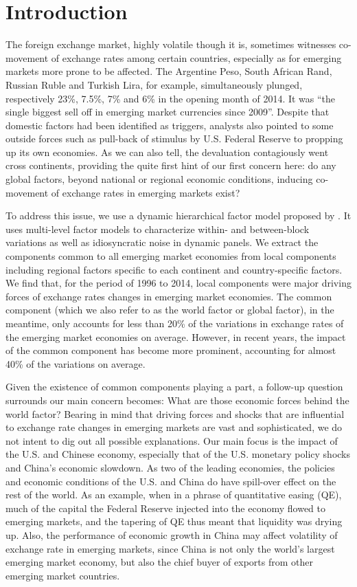 \documentclass[12pt]{article}
\numberwithin{equation}{section}
\begin{document}
\newpage
\section{Introduction}
The foreign exchange market, highly volatile though it is, sometimes witnesses co-movement of exchange rates among certain countries, especially as for emerging markets more prone to be affected. The Argentine Peso, South African Rand, Russian Ruble and Turkish Lira, for example, simultaneously plunged, respectively 23\%, 7.5\%, 7\% and 6\% in the opening month of 2014. It was ``the single biggest sell off in emerging market currencies since 2009''. Despite that domestic factors had been identified as triggers,  analysts also pointed to some outside forces such as pull-back of stimulus by U.S. Federal Reserve to propping up its own economies.  As we can also tell, the devaluation contagiously went cross continents, providing the quite first hint of our first concern here: do any global factors, beyond national or regional economic conditions, inducing co-movement of exchange rates in emerging markets exist?

To address this issue, we use a dynamic hierarchical factor model proposed by \cite{Moenchetal2013}. It uses multi-level factor models to characterize within- and between-block variations as well as idiosyncratic noise in dynamic panels. We extract the components common to all emerging market economies from local components including regional factors specific to each continent and country-specific factors. We find that, for the period of 1996 to 2014, local components were major driving forces of exchange rates changes in emerging market economies. The common component (which we also refer to as the world factor or global factor), in the meantime, only accounts for less than 20\% of the variations in exchange rates of the emerging market economies on average. However, in recent years, the impact of the common component has become more prominent, accounting for almost 40\% of the variations on average.

Given the existence of common components playing a part, a follow-up question surrounds our main concern becomes: What are those economic forces behind the world factor? Bearing in mind that driving forces and shocks that are influential to exchange rate changes in emerging markets are vast and sophisticated, we do not intent to dig out all possible explanations. Our main focus is the impact of the U.S. and Chinese economy, especially that of the U.S. monetary policy shocks and China's economic slowdown. As two of the leading economies, the policies and economic conditions of the U.S. and China do have spill-over effect on the rest of the world. As an example, when in a phrase of quantitative easing (QE), much of the capital the Federal Reserve injected into the economy flowed to emerging markets, and the tapering of QE thus meant that liquidity was drying up. Also, the performance of economic growth in China may affect volatility of exchange rate in emerging markets, since China is not only the world's largest emerging market economy, but also the chief buyer of exports from other emerging market countries.
\end{document}
